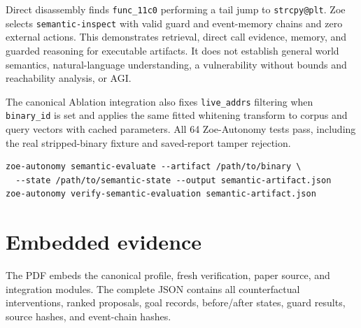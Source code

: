 \documentclass[11pt,a4paper]{article}
\begin{document}
Direct disassembly finds \texttt{func\_11c0} performing a tail jump to \texttt{strcpy@plt}. Zoe selects \texttt{semantic-inspect} with valid guard and event-memory chains and zero external actions. This demonstrates retrieval, direct call evidence, memory, and guarded reasoning for executable artifacts. It does not establish general world semantics, natural-language understanding, a vulnerability without bounds and reachability analysis, or AGI.

The canonical Ablation integration also fixes \texttt{live\_addrs} filtering when \texttt{binary\_id} is set and applies the same fitted whitening transform to corpus and query vectors with cached parameters. All 64 Zoe-Autonomy tests pass, including the real stripped-binary fixture and saved-report tamper rejection.

\begin{lstlisting}
zoe-autonomy semantic-evaluate --artifact /path/to/binary \
  --state /path/to/semantic-state --output semantic-artifact.json
zoe-autonomy verify-semantic-evaluation semantic-artifact.json
\end{lstlisting}


\section{Embedded evidence}
The PDF embeds the canonical profile, fresh verification, paper source, and integration modules. The complete JSON contains all counterfactual interventions, ranked proposals, goal records, before/after states, guard results, source hashes, and event-chain hashes.

\end{document}
